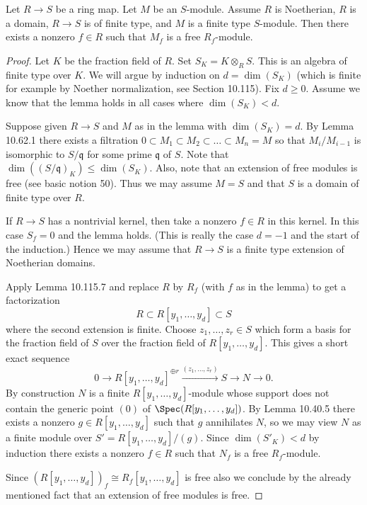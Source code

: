 \begin{lemma}
Let $R\to S$ be a ring map. Let $M$ be an $S$-module. Assume $R$ is Noetherian, $R$ is a domain, $R\to S$ is of finite type, and $M$ is a finite type $S$-module. Then there exists a nonzero $f\in R$ such that $M_f$ is a free $R_f$-module.
\end{lemma}
\begin{proof}
Let $K$ be the fraction field of $R$. Set $S_K=K\otimes_RS$. This is an algebra of finite type over $K$. We will argue by induction on $d=\dim(S_K)$ (which is finite for example by Noether normalization, see Section 10.115). Fix $d\geq0$. Assume we know that the lemma holds in all cases where $\dim(S_K)<d$.

Suppose given $R\to S$ and $M$ as in the lemma with $\dim(S_K)=d$. By Lemma 10.62.1 there exists a filtration $0\subset M_1\subset M_2\subset\ldots\subset M_n=M$ so that $M_i/M_{i-1}$ is isomorphic to $S/\mathfrak q$ for some prime $\mathfrak q$ of $S$. Note that $\dim((S/\mathfrak q)_K)\leq\dim(S_K)$. Also, note that an extension of free modules is free (see basic notion 50). Thus we may assume $M=S$ and that $S$ is a domain of finite type over $R$.

If $R\to S$ has a nontrivial kernel, then take a nonzero $f\in R$ in this kernel. In this case $S_f=0$ and the lemma holds. (This is really the case $d=-1$ and the start of the induction.) Hence we may assume that $R\to S$ is a finite type extension of Noetherian domains.

Apply Lemma 10.115.7 and replace $R$ by $R_f$ (with $f$ as in the lemma) to get a factorization
\[R\subset R[y_1,\ldots,y_d]\subset S\]
where the second extension is finite. Choose $z_1,\ldots,z_r\in S$ which form a basis for the fraction field of $S$ over the fraction field of $R[y_1,\ldots,y_d]$. This gives a short exact sequence
\[0\to R[y_1,\ldots,y_d]^{\oplus r}\xrightarrow{(z_1,\ldots,z_r)}S\to N\to0.\]
By construction $N$ is a finite $R[y_1,\ldots,y_d]$-module whose support does not contain the generic point $(0)$ of $\Spec(R[y_1,\ldots,y_d])$. By Lemma 10.40.5 there exists a nonzero $g\in R[y_1,\ldots,y_d]$ such that $g$ annihilates $N$, so we may view $N$ as a finite module over $S'=R[y_1,\ldots,y_d]/(g)$. Since $\dim(S'_K)<d$ by induction there exists a nonzero $f\in R$ such that $N_f$ is a free $R_f$-module.

Since $(R[y_1,\ldots,y_d])_f\cong R_f[y_1,\ldots,y_d]$ is free also we conclude by the already mentioned fact that an extension of free modules is free.
\end{proof}


